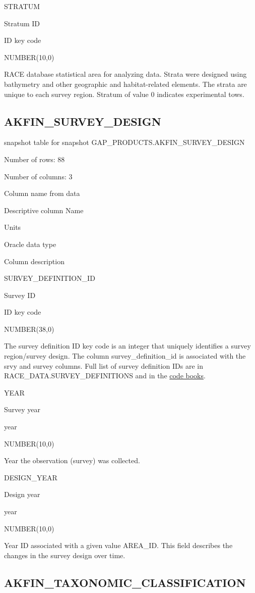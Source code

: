 \documentclass[
  letterpaper,
  oneside,
  open=any]{scrbook}
\begin{document}
STRATUM

Stratum ID

ID key code

NUMBER(10,0)

RACE database statistical area for analyzing data. Strata were designed
using bathymetry and other geographic and habitat-related elements. The
strata are unique to each survey region. Stratum of value 0 indicates
experimental tows.

\subsection{AKFIN\_SURVEY\_DESIGN}\label{akfin_survey_design}

snapshot table for snapshot GAP\_PRODUCTS.AKFIN\_SURVEY\_DESIGN

Number of rows: 88

Number of columns: 3

Column name from data

Descriptive column Name

Units

Oracle data type

Column description

SURVEY\_DEFINITION\_ID

Survey ID

ID key code

NUMBER(38,0)

The survey definition ID key code is an integer that uniquely identifies
a survey region/survey design. The column survey\_definition\_id is
associated with the srvy and survey columns. Full list of survey
definition IDs are in RACE\_DATA.SURVEY\_DEFINITIONS and in the
\href{https://www.fisheries.noaa.gov/resource/document/groundfish-survey-species-code-manual-and-data-codes-manual}{code
books}.

YEAR

Survey year

year

NUMBER(10,0)

Year the observation (survey) was collected.

DESIGN\_YEAR

Design year

year

NUMBER(10,0)

Year ID associated with a given value AREA\_ID. This field describes the
changes in the survey design over time.

\subsection{AKFIN\_TAXONOMIC\_CLASSIFICATION}\label{akfin_taxonomic_classification}
\end{document}
